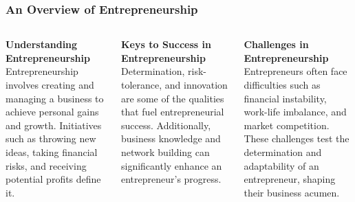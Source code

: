\documentclass[5pt]{beamer}
\begin{document}
\begin{frame}
\frametitle{An Overview of Entrepreneurship}
\begin{columns}
\begin{column}{0.3\textwidth}
\begin{block}{\textbf{Understanding Entrepreneurship}}
Entrepreneurship involves creating and managing a business to achieve personal gains and growth. Initiatives such as throwing new ideas, taking financial risks, and receiving potential profits define it.
\end{block}
\end{column}
\begin{column}{0.3\textwidth}
\begin{block}{\textbf{Keys to Success in Entrepreneurship}}
Determination, risk-tolerance, and innovation are some of the qualities that fuel entrepreneurial success. Additionally, business knowledge and network building can significantly enhance an entrepreneur's progress.
\end{block}
\end{column}
\begin{column}{0.3\textwidth}
\begin{block}{\textbf{Challenges in Entrepreneurship}}
Entrepreneurs often face difficulties such as financial instability, work-life imbalance, and market competition. These challenges test the determination and adaptability of an entrepreneur, shaping their business acumen.
\end{block}
\end{column}
\end{columns}
\end{frame}
\end{document}
